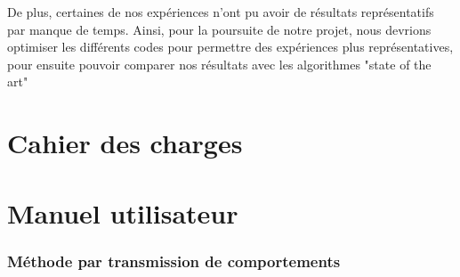 \documentclass[a4paper, 12pt]{report}
\begin{document}
De plus, certaines de nos expériences n'ont pu avoir de résultats représentatifs par manque de temps. Ainsi, pour la poursuite de notre projet, nous devrions optimiser les différents codes pour permettre des expériences plus représentatives, pour ensuite pouvoir comparer nos résultats avec les algorithmes "state of the art"


    \appendix

    \chapter{Cahier des charges}

    \chapter{Manuel utilisateur}
     
     
    \subsection{Méthode par transmission de comportements}
    
\end{document}
